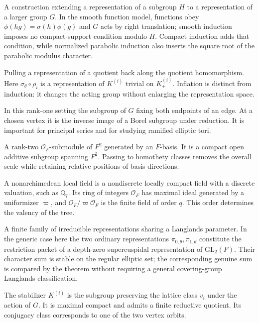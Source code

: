 \documentclass[12pt, letterpaper]{article}
\numberwithin{equation}{section}
\theoremstyle{definition}
\theoremstyle{remark}
\newcommand{\OO}{\mathcal{O}_F}
\begin{document}
\begin{description}[style=nextline,leftmargin=1.5em,itemsep=5pt]
 \item[Induced representation] A construction extending a representation of a subgroup $H$ to a representation of a larger group $G$. In the smooth function model, functions obey $\phi(hg)=\sigma(h)\phi(g)$ and $G$ acts by right translation; smooth induction imposes no compact-support condition modulo $H$. Compact induction adds that condition, while normalized parabolic induction also inserts the square root of the parabolic modulus character.
 \item[Inflation] Pulling a representation of a quotient back along the quotient homomorphism. Here $\sigma_\theta\circ\rho_i$ is a representation of $K^{(i)}$ trivial on $K^{(i)}_+$. Inflation is distinct from induction: it changes the acting group without enlarging the representation space.
 \item[Iwahori subgroup] In this rank-one setting the subgroup of $G$ fixing both endpoints of an edge. At a chosen vertex it is the inverse image of a Borel subgroup under reduction. It is important for principal series and for studying ramified elliptic tori.
 \item[Lattice] A rank-two $\OO$-submodule of $F^2$ generated by an $F$-basis. It is a compact open additive subgroup spanning $F^2$. Passing to homothety classes removes the overall scale while retaining relative positions of basis directions.
 \item[Local field and residue field] A nonarchimedean local field is a nondiscrete locally compact field with a discrete valuation, such as $\mathbb Q_7$. Its ring of integers $\OO$ has maximal ideal generated by a uniformizer $\varpi$, and $\OO/\varpi\OO$ is the finite field of order $q$. This order determines the valency of the tree.
 \item[$L$-packet (depth-zero)] A finite family of irreducible representations sharing a Langlands parameter. In the generic case here the two ordinary representations $\pi_{0,\theta},\pi_{1,\theta}$ constitute the restriction packet of a depth-zero supercuspidal representation of $\mathrm{GL}_2(F)$. Their character sum is stable on the regular elliptic set; the corresponding genuine sum is compared by the theorem without requiring a general covering-group Langlands classification.
 \item[Maximal compact subgroup and vertex stabilizer] The stabilizer $K^{(i)}$ is the subgroup preserving the lattice class $v_i$ under the action of $G$. It is maximal compact and admits a finite reductive quotient. Its conjugacy class corresponds to one of the two vertex orbits.

\end{description}
\end{document}
